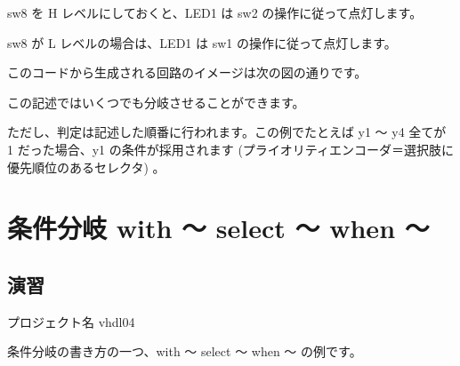 \documentclass[letterpaper,10pt,dvipdfmx]{sphinxmanual}
\begin{document}
sw8 を H レベルにしておくと、LED1 は sw2 の操作に従って点灯します。

sw8 が L レベルの場合は、LED1 は sw1 の操作に従って点灯します。

このコードから生成される回路のイメージは次の図の通りです。

\begin{figure}[htbp]
\centering

\noindent{}
\end{figure}

この記述ではいくつでも分岐させることができます。

\begin{sphinxVerbatim}[commandchars=\\\{\}]
      
       
       
       
   
\end{sphinxVerbatim}

ただし、判定は記述した順番に行われます。この例でたとえば y1 ～ y4 全てが 1 だった場合、y1 の条件が採用されます (プライオリティエンコーダ＝選択肢に優先順位のあるセレクタ) 。


\section{条件分岐 with ～ select ～ when ～}
\label{\detokenize{05_try:with-select-when}}

\subsection{演習}
\label{\detokenize{05_try:id8}}
プロジェクト名 vhdl04

条件分岐の書き方の一つ、with ～ select ～ when ～ の例です。
\end{document}

